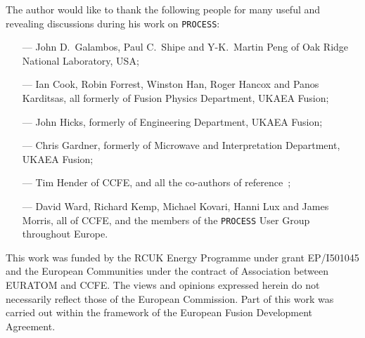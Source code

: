 \documentclass[11pt,a4paper]{report}
\newcommand{\process}{\mbox{\texttt{PROCESS}}}
\begin{document}
The author would like to thank the following people for many useful
and revealing discussions during his work on \process:

\begin{itemize}
\item[---]
John D.\ Galambos, Paul C.\ Shipe and Y-K.\ Martin Peng of Oak Ridge
National Laboratory, USA;
\item[---]
Ian Cook, Robin Forrest, Winston Han, Roger Hancox and Panos Karditsas, all formerly of
Fusion Physics Department, UKAEA Fusion;
\item[---]
John Hicks, formerly of Engineering Department, UKAEA Fusion;
\item[---]
Chris Gardner, formerly of Microwave and Interpretation Department, UKAEA
Fusion;
\item[---]
Tim Hender of CCFE, and all the co-authors of reference~\cite{172};
\item[---]
David Ward, Richard Kemp, Michael Kovari, Hanni Lux and James Morris, all of
CCFE, and the members of the \process\/ User Group throughout Europe.
\end{itemize}

This work was funded by the RCUK Energy Programme under grant EP/I501045 and
the European Communities under the contract of Association between EURATOM and
CCFE\@. The views and opinions expressed herein do not necessarily reflect those
of the European Commission. Part of this work was carried out within the
framework of the European Fusion Development Agreement.
\end{document}
